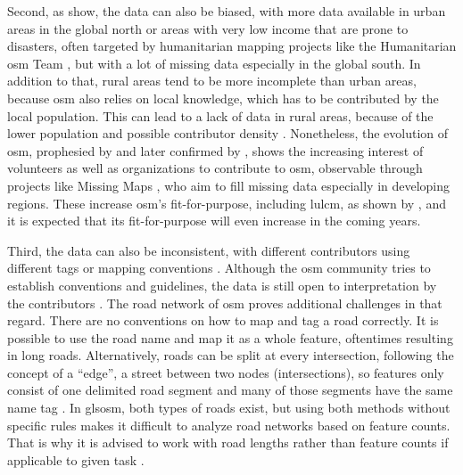 Second, as \textcite{Herfort.Lautenbach.ea2021} show, the data can also be biased, with more data available in urban areas in the global north or areas with very low income that are prone to disasters, often targeted by humanitarian mapping projects like the Humanitarian \gls{osm} Team \autocite{HOTOSM2024}, but with a lot of missing data especially in the global south. In addition to that, rural areas tend to be more incomplete than urban areas, because \gls{osm} also relies on local knowledge, which has to be contributed by the local population. This can lead to a lack of data in rural areas, because of the lower population and possible contributor density \autocite{Moradi.Roche.ea2021}. Nonetheless, the evolution of \gls{osm}, prophesied by \textcite{Barrington-Leigh.Millard-Ball2017,Neis.Zielstra.ea2012} and later confirmed by \textcite{Herfort.Lautenbach.ea2021,Forget.Linard.ea2018}, shows the increasing interest of volunteers as well as organizations to contribute to \gls{osm}, observable through projects like Missing Maps \autocite{MissingMaps2024}, who aim to fill missing data especially in developing regions. These increase \gls{osm}'s fit-for-purpose, including \gls{lulcm}, as shown by \textcite{Schott.Zell.ea2024}, and it is expected that its fit-for-purpose will even increase in the coming years.

Third, the data can also be inconsistent, with different contributors using different tags or mapping conventions \autocite{Ludwig.Hecht.ea2021,Majic.Winter.ea2017}. Although the \gls{osm} community tries to establish conventions and guidelines, the data is still open to interpretation by the contributors \autocite{Mocnik.Zipf.ea2017}. The road network of \gls{osm} proves additional challenges in that regard. There are no conventions on how to map and tag a road correctly. It is possible to use the road name and map it as a whole feature, oftentimes resulting in long roads. Alternatively, roads can be split at every intersection, following the concept of a \enquote{edge}, a street between two nodes (intersections), so features only consist of one delimited road segment and many of those segments have the same name tag \autocite{Barrington-Leigh.Millard-Ball2017,Marshall.Gil.ea2018}. In gls{osm}, both types of roads exist, but using both methods without specific rules makes it difficult to analyze road networks based on feature counts. That is why it is advised to work with road lengths rather than feature counts if applicable to given task \autocite{Hacar.Kilic.ea2018,Vargas-Munoz.Srivastava.ea2021}.

